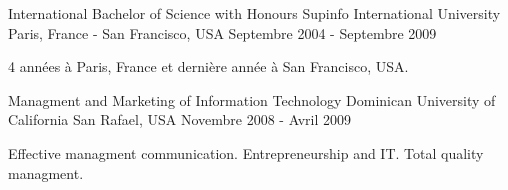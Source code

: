
\begin{cventries}

    \cventry
    {International Bachelor of Science with Honours} %
    {Supinfo International University} %
    {Paris, France - San Francisco, USA} %
    {Septembre 2004 - Septembre 2009} %
    {
    \begin{cvitems} %
        \item {4 années à Paris, France et dernière année à San Francisco, USA.}
    \end{cvitems}
    }

    \cventry
    {Managment and Marketing of Information Technology} %
    {Dominican University of California} %
    {San Rafael, USA} %
    {Novembre 2008 - Avril 2009} %
    {
    \begin{cvitems} %
        \item {Effective managment communication. Entrepreneurship and IT. Total quality managment.}
    \end{cvitems}
    }

\end{cventries}
